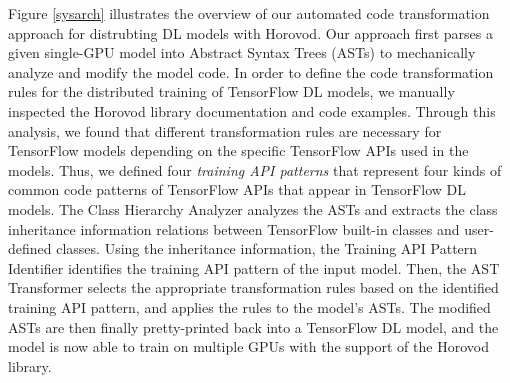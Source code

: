 Figure \ref{sysarch} illustrates the overview of our automated code
transformation approach for distrubting DL models with Horovod.
Our approach first parses a given single-GPU model into Abstract Syntax Trees
(ASTs) to mechanically analyze and modify the model code.
In order to define the code transformation rules for the distributed training
of TensorFlow DL models, we manually inspected the Horovod library
documentation and code examples. 
Through this analysis, we found that different transformation rules are
necessary for TensorFlow models depending on the specific TensorFlow APIs used
in the models.
Thus, we defined four \textit{training API patterns} that represent four kinds
of common code patterns of TensorFlow APIs that appear in TensorFlow DL models.
The {\sc Class Hierarchy Analyzer} analyzes the ASTs and extracts the class
inheritance information relations between TensorFlow built-in classes and
user-defined classes.
Using the inheritance information, the {\sc Training API Pattern Identifier}
identifies the training API pattern of the input model.
Then, the {\sc AST Transformer} selects the appropriate
transformation rules based on the identified training API pattern, and applies
the rules to the model's ASTs. 
The modified ASTs are then finally pretty-printed back into a TensorFlow DL
model, and the model is now able to train on multiple GPUs with the support of
the Horovod library.






